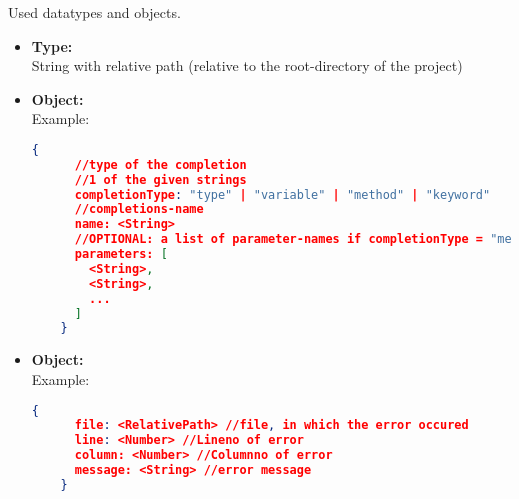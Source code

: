 Used datatypes and objects.
\begin{itemize}
  \item \textbf{Type:}  \\
  String with relative path (relative to the root-directory of the project)

  \item \textbf{Object:}  \\
  Example:
  \begin{lstlisting}[basicstyle=\small,
    language=json]
    {
      //type of the completion
      //1 of the given strings
      completionType: "type" | "variable" | "method" | "keyword"
      //completions-name
      name: <String>
      //OPTIONAL: a list of parameter-names if completionType = "method"
      parameters: [
        <String>,
        <String>,
        ...
      ]
    }
  \end{lstlisting}

  \item \textbf{Object:}  \\
  Example:
  \begin{lstlisting}[basicstyle=\small,
    language=json]
    {
      file: <RelativePath> //file, in which the error occured
      line: <Number> //Lineno of error
      column: <Number> //Columnno of error
      message: <String> //error message
    }
  \end{lstlisting}
\end{itemize}
